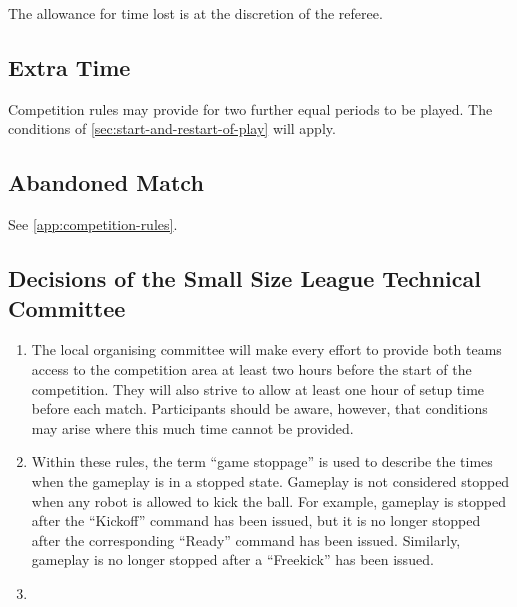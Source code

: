 The allowance for time lost is at the discretion of the referee.

\subsection{Extra Time}
Competition rules may provide for two further equal periods to be played.
The conditions of \autoref{sec:start-and-restart-of-play} will apply.

\subsection{Abandoned Match}
See \autoref{app:competition-rules}.

\subsection*{Decisions of the Small Size League Technical Committee}
\begin{enumerate}
\item
The local organising committee will make every effort to provide both teams access to the competition area at least two hours before the start of the competition.
They will also strive to allow at least one hour of setup time before each match.
Participants should be aware, however, that conditions may arise where this much time cannot be provided.

\item
Within these rules, the term ``game stoppage'' is used to describe the times when the gameplay is in a stopped state.
Gameplay is not considered stopped when any robot is allowed to kick the ball.
For example, gameplay is stopped after the ``Kickoff'' command has been issued, but it is no longer stopped after the corresponding ``Ready'' command has been issued.
Similarly, gameplay is no longer stopped after a ``Freekick'' has been issued.

\item
{}
\end{enumerate}
